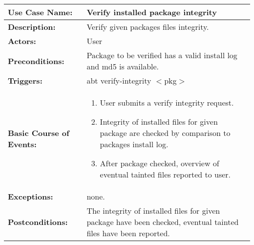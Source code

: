 
\begin{tabularx}{\linewidth}{|l|X|}
\hline
\textbf{Use Case Name:} & \textbf{Verify installed package integrity} \\
\hline
\textbf{Description:} & 
Verify given packages files integrity.
\\
\hline
\textbf{Actors:} & User \\
\hline
\textbf{Preconditions:} & Package to be verified has a valid install log and md5 is available. \\
\hline
\textbf{Triggers:} & abt verify-integrity $<$pkg$>$ \\
\hline
\textbf{Basic Course of Events:} & 
\begin{minipage}{\linewidth} 
  \vspace{0.05em}
  \begin{enumerate}
    \item User submits a verify integrity request.
    \item Integrity of installed files for given package are checked by comparison to packages install log.
    \item After package checked, overview of eventual tainted files reported to user.
  \end{enumerate}
  \vspace{0.05em}
\end{minipage}
\\
\hline 
\textbf{Exceptions:} & none. \\
\hline 
\textbf{Postconditions:} &
The integrity of installed files for given package have been checked, eventual tainted files have been reported. \\
\hline
\end{tabularx}



